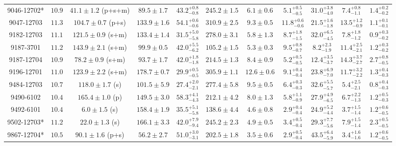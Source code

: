 \begin{landscape}
\begin{longtable}{ccccccccccc}
9046-12702* & $10.9$  & $41.1 \pm 1.2$ (p+s+m)  & $89.5 \pm 1.7$ & $43.2^{+0.8}_{-0.8}$  & $245.2 \pm 1.5 $ & $6.1 \pm 0.6 $ & $5.1^{+0.5}_{-0.5}$  & $31.0^{+3.8}_{-4.0}$  & $7.4^{+0.8}_{-1.1}$  & $1.4^{+0.2}_{-0.2}$ \\ 
9047-12703 & $11.3$  & $104.7 \pm 0.7$ (p+s)  & $133.9 \pm 1.6$ & $54.1^{+0.6}_{-0.6}$  & $310.9 \pm 2.5 $ & $9.3 \pm 0.5 $ & $11.8^{+0.6}_{-0.6}$  & $21.5^{+1.6}_{-1.8}$  & $13.5^{+1.2}_{-0.9}$  & $1.1^{+0.1}_{-0.1}$ \\ 
9182-12703 & $11.1$  & $121.5 \pm 0.9$ (s+m)  & $133.4 \pm 1.4$ & $31.5^{+5.0}_{-5.8}$  & $278.0 \pm 3.1 $ & $5.8 \pm 1.3 $ & $8.7^{+1.8}_{-1.5}$  & $32.0^{+6.5}_{-4.5}$  & $7.8^{+1.8}_{-1.2}$  & $0.9^{+0.3}_{-0.2}$ \\ 
9187-3701 & $11.2$  & $143.9 \pm 2.1$ (s+m)  & $99.9 \pm 0.5$ & $42.0^{+5.5}_{-6.2}$  & $105.2 \pm 1.5 $ & $5.3 \pm 0.3 $ & $9.5^{+0.8}_{-0.7}$  & $8.2^{+2.3}_{-1.9}$  & $11.4^{+2.5}_{-2.1}$  & $1.2^{+0.3}_{-0.2}$ \\ 
9187-12704 & $10.9$  & $78.2 \pm 0.9$ (s+m)  & $93.7 \pm 1.7$ & $42.0^{+1.8}_{-1.8}$  & $214.5 \pm 1.3 $ & $8.4 \pm 0.9 $ & $5.2^{+0.5}_{-0.5}$  & $12.4^{+3.5}_{-3.7}$  & $14.3^{+3.7}_{-2.7}$  & $2.7^{+0.8}_{-0.5}$ \\ 
9196-12701 & $11.0$  & $123.9 \pm 2.2$ (s+m)  & $178.7 \pm 0.7$ & $29.9^{+0.5}_{-0.5}$  & $305.9 \pm 1.1 $ & $12.6 \pm 0.6 $ & $9.1^{+0.4}_{-0.4}$  & $23.8^{+6.9}_{-7.0}$  & $11.7^{+3.2}_{-2.2}$  & $1.3^{+0.4}_{-0.3}$ \\ 
9484-12703 & $10.7$  & $118.0 \pm 1.7$ (s)  & $101.5 \pm 5.9$ & $27.4^{+2.0}_{-2.1}$  & $277.4 \pm 5.8 $ & $9.5 \pm 0.5 $ & $6.4^{+0.3}_{-0.3}$  & $32.6^{+5.5}_{-5.7}$  & $5.4^{+2.5}_{-2.1}$  & $0.8^{+0.4}_{-0.3}$ \\ 
9490-6102 & $10.4$  & $165.4 \pm 1.0$ (p)  & $149.5 \pm 3.0$ & $58.3^{+4.1}_{-4.3}$  & $212.1 \pm 4.2 $ & $8.0 \pm 1.3 $ & $5.8^{+1.1}_{-0.9}$  & $27.9^{+4.9}_{-6.5}$  & $6.7^{+2.2}_{-1.3}$  & $1.2^{+0.5}_{-0.3}$ \\ 
9492-6101 & $10.4$  & $6.0 \pm 1.5$ (s)  & $158.4 \pm 1.9$ & $35.5^{+5.1}_{-5.8}$  & $138.6 \pm 4.4 $ & $4.6 \pm 0.8 $ & $2.9^{+0.4}_{-0.4}$  & $24.9^{+5.2}_{-4.4}$  & $3.7^{+1.5}_{-1.4}$  & $1.2^{+0.6}_{-0.5}$ \\ 
9502-12703* & $11.2$  & $22.0 \pm 1.3$ (s)  & $166.1 \pm 3.3$ & $42.0^{+7.9}_{-9.4}$  & $245.2 \pm 2.3 $ & $4.9 \pm 0.5 $ & $3.4^{+0.5}_{-0.4}$  & $29.3^{+7.7}_{-5.6}$  & $7.9^{+1.5}_{-1.4}$  & $2.3^{+0.5}_{-0.5}$ \\ 
9867-12704* & $10.5$  & $90.1 \pm 1.6$ (p+s)  & $56.2 \pm 2.7$ & $51.0^{+3.0}_{-3.1}$  & $202.5 \pm 1.8 $ & $3.5 \pm 0.6 $ & $2.9^{+0.5}_{-0.4}$  & $43.5^{+6.4}_{-5.9}$  & $3.4^{+1.6}_{-1.6}$  & $1.2^{+0.6}_{-0.5}$ \\ 

\end{longtable}
\end{landscape}
